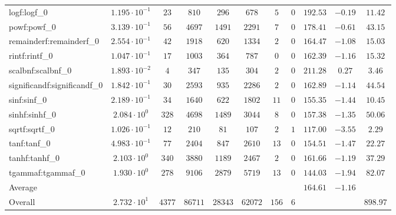 \begin{tabular}{|l|c|c|c|c|c|c|c|c|c|c|}
logf:logf\_0                 & $ 1.195 \cdot 10^{-1} $ & $ 23     $ & $ 810   $ & $ 296   $ & $ 678   $ & $ 5   $ & $ 0 $ & $ 192.53      $ & $ -0.19   $ & $ 11.42   $ \\
powf:powf\_0                 & $ 3.139 \cdot 10^{-1} $ & $ 56     $ & $ 4697  $ & $ 1491  $ & $ 2291  $ & $ 7   $ & $ 0 $ & $ 178.41      $ & $ -0.61   $ & $ 43.15   $ \\
remainderf:remainderf\_0     & $ 2.554 \cdot 10^{-1} $ & $ 42     $ & $ 1918  $ & $ 620   $ & $ 1334  $ & $ 2   $ & $ 0 $ & $ 164.47      $ & $ -1.08   $ & $ 15.03   $ \\
rintf:rintf\_0               & $ 1.047 \cdot 10^{-1} $ & $ 17     $ & $ 1003  $ & $ 364   $ & $ 787   $ & $ 0   $ & $ 0 $ & $ 162.39      $ & $ -1.16   $ & $ 15.32   $ \\
scalbnf:scalbnf\_0           & $ 1.893 \cdot 10^{-2} $ & $ 4      $ & $ 347   $ & $ 135   $ & $ 304   $ & $ 2   $ & $ 0 $ & $ 211.28      $ & $ 0.27    $ & $ 3.46    $ \\
significandf:significandf\_0 & $ 1.842 \cdot 10^{-1} $ & $ 30     $ & $ 2593  $ & $ 935   $ & $ 2286  $ & $ 2   $ & $ 0 $ & $ 162.89      $ & $ -1.14   $ & $ 44.54   $ \\
sinf:sinf\_0                 & $ 2.189 \cdot 10^{-1} $ & $ 34     $ & $ 1640  $ & $ 622   $ & $ 1802  $ & $ 11  $ & $ 0 $ & $ 155.35      $ & $ -1.44   $ & $ 10.45   $ \\
sinhf:sinhf\_0               & $ 2.084 \cdot 10^{0}  $ & $ 328    $ & $ 4698  $ & $ 1489  $ & $ 3044  $ & $ 8   $ & $ 0 $ & $ 157.38      $ & $ -1.35   $ & $ 50.06   $ \\
sqrtf:sqrtf\_0               & $ 1.026 \cdot 10^{-1} $ & $ 12     $ & $ 210   $ & $ 81    $ & $ 107   $ & $ 2   $ & $ 1 $ & $ 117.00      $ & $ -3.55   $ & $ 2.29    $ \\
tanf:tanf\_0                 & $ 4.983 \cdot 10^{-1} $ & $ 77     $ & $ 2404  $ & $ 847   $ & $ 2610  $ & $ 13  $ & $ 0 $ & $ 154.51      $ & $ -1.47   $ & $ 22.27   $ \\
tanhf:tanhf\_0               & $ 2.103 \cdot 10^{0}  $ & $ 340    $ & $ 3880  $ & $ 1189  $ & $ 2467  $ & $ 2   $ & $ 0 $ & $ 161.66      $ & $ -1.19   $ & $ 37.29   $ \\
tgammaf:tgammaf\_0           & $ 1.930 \cdot 10^{0}  $ & $ 278    $ & $ 9106  $ & $ 2879  $ & $ 5719  $ & $ 13  $ & $ 0 $ & $ 144.03      $ & $ -1.94   $ & $ 82.07   $ \\
\hline
Average                      & $                     $ & $        $ & $       $ & $       $ & $       $ & $     $ & $   $ & $ 164.61      $ & $ -1.16   $ & $         $ \\
\hline
Overall                      & $ 2.732 \cdot 10^{1}  $ & $ 4377   $ & $ 86711 $ & $ 28343 $ & $ 62072 $ & $ 156 $ & $ 6 $ & $             $ & $         $ & $ 898.97  $ \\
\hline
\end{tabular}
